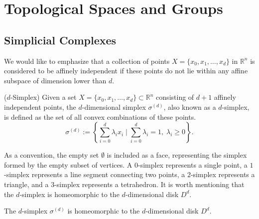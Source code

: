\section{Topological Spaces and Groups}

\subsection{Simplicial Complexes}
\label{simplicialcomplexes} We would like to emphasize that a collection of points
$X = \{x_{0}, x_{1}, \ldots, x_{d}\}$ in $\mathbb{R}^{n}$ is considered to be affinely
independent if these points do not lie within any affine subspace of dimension lower
than $d$.

\begin{definition}
	{($d$-Simplex) \cite[§2.1]{boissonnat2018geometric}} \label{d-simplex} Given a
	set $X = \{x_{0}, x_{1}, \ldots, x_{d}\} \subset \mathbb{R}^{n}$ consisting of
	$d+1$ affinely independent points, the $d$-dimensional simplex $\sigma^{(d)}$,
	also known as a $d$-simplex, is defined as the set of all convex combinations
	of these points.
	\begin{equation}
		\sigma^{(d)}:= \left\{\sum_{i=0}^{d}\lambda_{i} x_{i} \; \vert \; \sum_{i=0}^{d}
		\lambda_{i} = 1, \; \lambda_{i} \geq 0 \right\}.
	\end{equation}
\end{definition}

As a convention, the empty set $\emptyset$ is included as a face, representing
the simplex formed by the empty subset of vertices. A $0$-simplex represents a single
point, a $1$-simplex represents a line segment connecting two points, a $2$-simplex
represents a triangle, and a $3$-simplex represents a tetrahedron. It is worth mentioning
that the $d$-simplex is homeomorphic to the $d$-dimensional disk $D^{d}$.

\begin{theorem}
	The $d$-simplex $\sigma^{(d)}$ is homeomorphic to the $d$-dimensional disk $D^{d}$.
\end{theorem}

